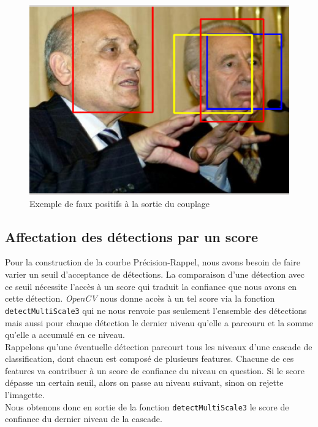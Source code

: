 \documentclass[a4paper,11pt]{article}
\begin{document}
	    \begin{figure}[H]
	        \begin{center}
	    	\includegraphics[scale = 0.4]{images/false_positive.png}
	    	\caption{Exemple de faux positifs à la sortie du couplage}
	    	\label{fig:false_positive_couplage}
	        \end{center}
	    \end{figure}

    \subsection{Affectation des détections par un score}

        Pour la construction de la courbe Précision-Rappel, nous avons besoin de faire varier un seuil d'acceptance de détections.
        La comparaison d'une détection avec ce seuil nécessite l'accès à un score qui traduit la confiance que nous avons en cette détection.
        {\it OpenCV} nous donne accès à un tel score via la fonction \verb!detectMultiScale3! qui ne nous renvoie pas seulement l'ensemble des détections mais aussi pour chaque détection le dernier niveau qu'elle a parcouru et la somme qu'elle a accumulé en ce niveau. 
        \\
        Rappelons qu'une éventuelle détection parcourt tous les niveaux d'une cascade de classification, dont chacun est composé de plusieurs features.
        Chacune de ces features va contribuer à un score de confiance du niveau en question. 
        Si le score dépasse un certain seuil, alors on passe au niveau suivant, sinon on rejette l'imagette.
        \\
        Nous obtenons donc en sortie de la fonction \verb!detectMultiScale3! le score de confiance du dernier niveau de la cascade.
\end{document}
